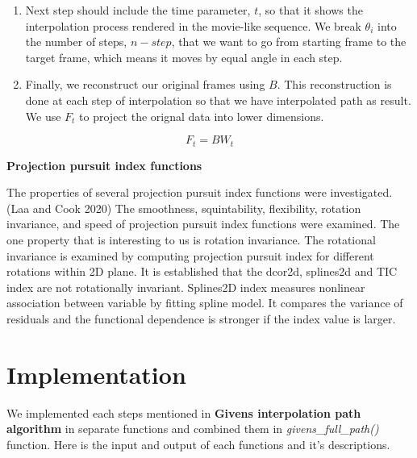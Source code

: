 \begin{enumerate}
\def\labelenumi{\arabic{enumi}.}
\setcounter{enumi}{4}
\item
  Next step should include the time parameter, \(t\), so that it shows the interpolation process rendered in the movie-like sequence. We break \(\theta_i\) into the number of steps, \(n-step\), that we want to go from starting frame to the target frame, which means it moves by equal angle in each step.
\item
  Finally, we reconstruct our original frames using \(B\). This reconstruction is done at each step of interpolation so that we have interpolated path as result. We use \(F_t\) to project the orignal data into lower dimensions.
\end{enumerate}

\[F_t = B  W_t\]

\textbf{Projection pursuit index functions}

The properties of several projection pursuit index functions were investigated.(Laa and Cook 2020) The smoothness, squintability, flexibility, rotation invariance, and speed of projection pursuit index functions were examined. The one property that is interesting to us is rotation invariance. The rotational invariance is examined by computing projection pursuit index for different rotations within 2D plane. It is established that the dcor2d, splines2d and TIC index are not rotationally invariant. Splines2D index measures nonlinear association between variable by fitting spline model. It compares the variance of residuals and the functional dependence is stronger if the index value is larger.

\hypertarget{implementation}{%
\section{Implementation}\label{implementation}}

We implemented each steps mentioned in \textbf{Givens interpolation path algorithm} in separate functions and combined them in \emph{givens\_full\_path()} function. Here is the input and output of each functions and it's descriptions.

